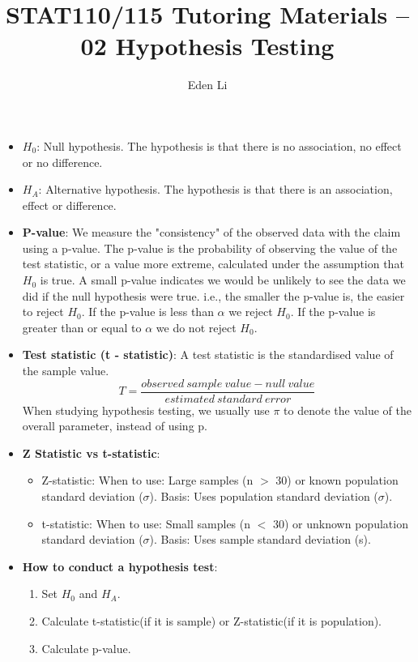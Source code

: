 \documentclass[12pt]{article}
\author{Eden Li}
\title{STAT110/115 Tutoring Materials – 02 Hypothesis Testing}
\date{}
\begin{document}
\pagestyle{fancy}

\begin{itemize}
\item \textbf{$H_0$}: Null hypothesis. The hypothesis is that there is no association, no effect or no difference.
\item \textbf{$H_A$}: Alternative hypothesis. The hypothesis is that there is an association, effect or difference.
\item \textbf{P-value}: We measure the "consistency" of the observed data with the claim using a p-value. The p-value is the probability of observing the value of the test statistic, or a value more extreme, calculated under the assumption that $H_0$ is true. A small p-value indicates we would be unlikely to see the data we did if the null hypothesis were true. i.e., the smaller the p-value is, the easier to reject $H_0$. If the p-value is less than $\alpha$ we reject $H_0$. If the p-value is greater than or equal to $\alpha$ we do not reject $H_0$.
\item \textbf{Test statistic (t - statistic)}: A test statistic is the standardised value of the sample value. 
$$T = \frac{observed \ sample \ value - null \ value}{estimated \ standard \ error}$$
When studying hypothesis testing, we usually use $\pi$ to denote the value of the overall parameter, instead of using p.
\item \textbf{Z Statistic vs t-statistic}:
\begin{itemize}
\item Z-statistic: When to use: Large samples (n $>$ 30) or known population standard deviation ($\sigma$). Basis: Uses population standard deviation ($\sigma$).
\item t-statistic: When to use: Small samples (n $<$ 30) or unknown population standard deviation ($\sigma$). Basis: Uses sample standard deviation (s).
\end{itemize}
\item \textbf{How to conduct a hypothesis test}:
\begin{enumerate}
\item Set $H_0$ and $H_A$.
\item Calculate t-statistic(if it is sample) or Z-statistic(if it is population).
\item Calculate p-value.

\end{enumerate}
\end{itemize}
\end{document}
